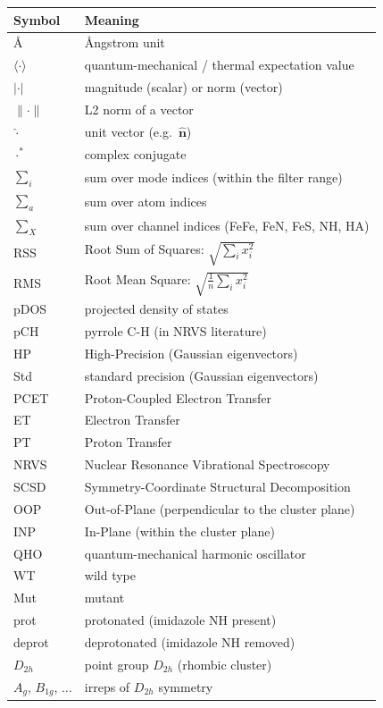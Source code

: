 \documentclass[11pt,a4paper,twoside]{article}
\providecommand{\angstrom}{\text{\AA}}    %
\theoremstyle{remark}
\begin{document}
\begin{tabular}{p{2cm} p{8.5cm}}
  \toprule
  \textbf{Symbol} & \textbf{Meaning} \\
  \midrule
  $\angstrom$    & \AA{}ngstrom unit \\
  $\langle\cdot\rangle$ & quantum-mechanical / thermal expectation value \\
  $|\cdot|$      & magnitude (scalar) or norm (vector) \\
  $\|\cdot\|$    & L2 norm of a vector \\
  $\hat{\cdot}$  & unit vector (e.g.\ $\hat{\mathbf{n}}$) \\
  $\cdot^*$      & complex conjugate \\
  $\sum_i$       & sum over mode indices (within the filter range) \\
  $\sum_a$       & sum over atom indices \\
  $\sum_X$       & sum over channel indices (FeFe, FeN, FeS, NH, HA) \\
  RSS            & Root Sum of Squares: $\sqrt{\sum_i x_i^2}$ \\
  RMS            & Root Mean Square: $\sqrt{\frac{1}{n}\sum_i x_i^2}$ \\
  pDOS           & projected density of states \\
  pCH            & pyrrole C-H (in NRVS literature) \\
  HP             & High-Precision (Gaussian eigenvectors) \\
  Std            & standard precision (Gaussian eigenvectors) \\
  PCET           & Proton-Coupled Electron Transfer \\
  ET             & Electron Transfer \\
  PT             & Proton Transfer \\
  NRVS           & Nuclear Resonance Vibrational Spectroscopy \\
  SCSD           & Symmetry-Coordinate Structural Decomposition \\
  OOP            & Out-of-Plane (perpendicular to the cluster plane) \\
  INP            & In-Plane (within the cluster plane) \\
  QHO            & quantum-mechanical harmonic oscillator \\
  WT             & wild type \\
  Mut            & mutant \\
  prot           & protonated (imidazole NH present) \\
  deprot         & deprotonated (imidazole NH removed) \\
  $D_{2h}$       & point group $D_{2h}$ (rhombic cluster) \\
  $A_g$, $B_{1g}$, $\ldots$ & irreps of $D_{2h}$ symmetry \\
  \bottomrule
\end{tabular}
\end{document}
